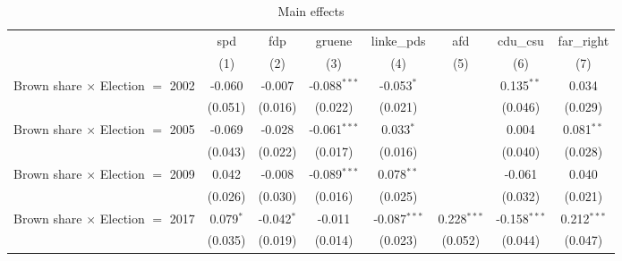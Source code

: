 \begin{table}[htbp]
   \caption{Main effects}
   \centering
   \begin{tabular}{lccccccc}
      \tabularnewline \midrule \midrule
                                                              & spd                  & fdp                   & gruene                & linke\_pds     & afd            & cdu\_csu       & far\_right\\   
                                                              & (1)                  & (2)                   & (3)                   & (4)            & (5)            & (6)            & (7)\\  
      Brown share $\times$ Election $=$ 2002                  & -0.060               & -0.007                & -0.088$^{***}$        & -0.053$^{*}$   &                & 0.135$^{**}$   & 0.034\\   
                                                              & (0.051)              & (0.016)               & (0.022)               & (0.021)        &                & (0.046)        & (0.029)\\   
      Brown share $\times$ Election $=$ 2005                  & -0.069               & -0.028                & -0.061$^{***}$        & 0.033$^{*}$    &                & 0.004          & 0.081$^{**}$\\   
                                                              & (0.043)              & (0.022)               & (0.017)               & (0.016)        &                & (0.040)        & (0.028)\\   
      Brown share $\times$ Election $=$ 2009                  & 0.042                & -0.008                & -0.089$^{***}$        & 0.078$^{**}$   &                & -0.061         & 0.040\\   
                                                              & (0.026)              & (0.030)               & (0.016)               & (0.025)        &                & (0.032)        & (0.021)\\   
      Brown share $\times$ Election $=$ 2017                  & 0.079$^{*}$          & -0.042$^{*}$          & -0.011                & -0.087$^{***}$ & 0.228$^{***}$  & -0.158$^{***}$ & 0.212$^{***}$\\   
                                                              & (0.035)              & (0.019)               & (0.014)               & (0.023)        & (0.052)        & (0.044)        & (0.047)\\   

\end{tabular}
\end{table}
